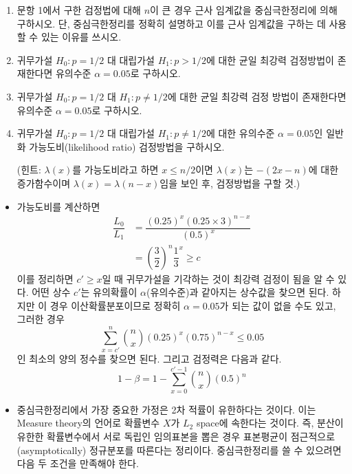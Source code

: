\documentclass[answers]{exam}
\begin{document}
\begin{questions}
\begin{enumerate}
    \item 문항 1에서 구한 검정법에 대해 $n$이 큰 경우 근사 임계값을 중심극한정리에 의해 구하시오. 단, 중심극한정리를 정확히 설명하고 이를 근사 임계값을 구하는 데 사용할 수 있는 이유를 쓰시오.
    \item 귀무가설 $H_{0}:p=1/2$ 대 대립가설 $H_{1}:p>1/2$에 대한 균일 최강력 검정방법이 존재한다면 유의수준 $\alpha=0.05$로 구하시오.
    \item 귀무가설 $H_{0}:p=1/2$ 대 $H_{1}:p\neq 1/2$에 대한 균일 최강력 검정 방법이 존재한다면 유의수준 $\alpha = 0.05$로 구하시오.
    \item 귀무가설 $H_{0}:p=1/2$ 대 대립가설 $H_{1}:p\neq 1/2$에 대한 유의수준 $\alpha=0.05$인 일반화 가능도비(likelihood ratio) 검정방법을 구하시오. \par
    (힌트: $\lambda\left(x\right)$를 가능도비라고 하면 $x\leq n/2$이면 $\lambda\left(x\right)$는 $-\left(2x-n\right)$에 대한 증가함수이며 $\lambda\left(x\right)=\lambda\left(n-x\right)$임을 보인 후, 검정방법을 구할 것.)
   \end{enumerate}
   \begin{solution}
    \begin{itemize}
      \item 가능도비를 계산하면
      \begin{align}
        \dfrac{L_{0}}{L_{1}} &= \dfrac{\left(0.25\right)^{x}\left(0.25\times 3\right)^{n-x}}{\left(0.5\right)^{x}}\\
        &= \left(\dfrac{3}{2}\right)^{n}\dfrac{1}{3}^{x} \geq c
      \end{align}
      이를 정리하면 $c' \geq x$일 때 귀무가설을 기각하는 것이 최강력 검정이 됨을 알 수 있다. 어떤 상수 $c'$는 유의확률이 $\alpha$(유의수준)과 같아지는 상수값을 찾으면 된다. 하지만 이 경우 이산확률분포이므로 정확히 $\alpha=0.05$가 되는 값이 없을 수도 있고, 그러한 경우 
      \begin{equation}
        \sum_{x=c'}^{n}{{n}\choose{x}}\left(0.25\right)^{x}\left(0.75\right)^{n-x} \leq 0.05
      \end{equation}
      인 최소의 양의 정수를 찾으면 된다. 그리고 검정력은 다음과 같다.
      \begin{equation}
        1-\beta = 1-\sum_{x=0}^{c'-1}{{n}\choose{x}}\left(0.5\right)^{n}
      \end{equation}
      \item 중심극한정리에서 가장 중요한 가정은 2차 적률이 유한하다는 것이다. 이는 Measure theory의 언어로 확률변수 $X$가 $L_{2}$ space에 속한다는 것이다. 즉, 분산이 유한한 확률변수에서 서로 독립인 임의표본을 뽑은 경우 표본평균이 점근적으로(asymptotically) 정규분포를 따른다는 정리이다. 중심극한정리를 쓸 수 있으려면 다음 두 조건을 만족해야 한다.

\end{itemize}
\end{solution}
\end{questions}
\end{document}
